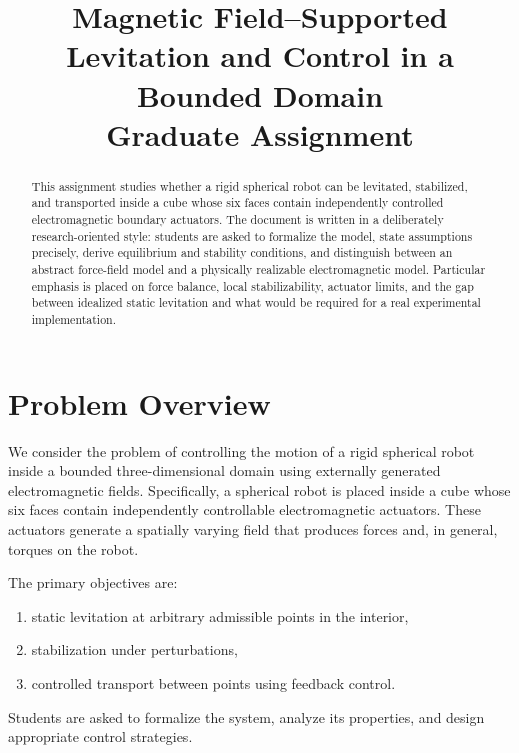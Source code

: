 \documentclass[11pt]{article}
\title{\textbf{Magnetic Field--Supported Levitation and Control in a Bounded Domain}\\
\large Graduate Assignment}
\author{}
\date{}
\begin{document}
\maketitle

\begin{abstract}
This assignment studies whether a rigid spherical robot can be levitated, stabilized, and transported inside a cube whose six faces contain independently controlled electromagnetic boundary actuators. The document is written in a deliberately research-oriented style: students are asked to formalize the model, state assumptions precisely, derive equilibrium and stability conditions, and distinguish between an abstract force-field model and a physically realizable electromagnetic model. Particular emphasis is placed on force balance, local stabilizability, actuator limits, and the gap between idealized static levitation and what would be required for a real experimental implementation.
\end{abstract}

\section{Problem Overview}
We consider the problem of controlling the motion of a rigid spherical robot inside a bounded three-dimensional domain using externally generated electromagnetic fields. Specifically, a spherical robot is placed inside a cube whose six faces contain independently controllable electromagnetic actuators. These actuators generate a spatially varying field that produces forces and, in general, torques on the robot.

The primary objectives are:
\begin{enumerate}[label=\arabic*.]
    \item static levitation at arbitrary admissible points in the interior,
    \item stabilization under perturbations,
    \item controlled transport between points using feedback control.
\end{enumerate}

Students are asked to formalize the system, analyze its properties, and design appropriate control strategies.
\end{document}
